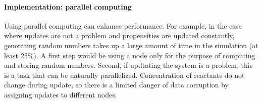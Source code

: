 \paragraph {Implementation: parallel computing} Using parallel computing can enhance performance. For example, in the case where updates are not a problem and propensities are updated constantly, generating random numbers takes up a large amount of time in the simulation (at least 25\%). A first step would be using a node only for the purpose of computing and storing random numbers. Second, if updtating the system is a problem, this is a task that can be naturally parallelized. Concentration of reactants do not change during update, so there is a limited danger of data corruption by assigning updates to different nodes.
